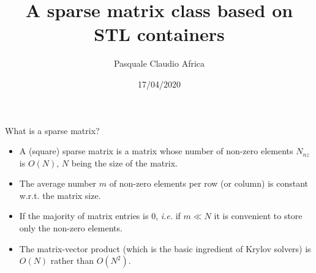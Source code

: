 \documentclass[10pt]{beamer}
\begin{document}
    \title{A sparse matrix class based on STL containers}
    \author{Pasquale Claudio Africa}
    \date{17/04/2020}

\begin{frame}
    \maketitle
\end{frame}


\begin{frame}{What is a sparse matrix?}
\begin{itemize}
\item A (square) sparse matrix is a matrix whose number of non-zero elements $N_{nz}$ is $O(N)$, 
$N$ being the size of the matrix. \\[3mm]
\item The average number $m$ of non-zero elements per row (or column)
is constant w.r.t. the matrix size. \\[3mm]
\item If the majority of matrix entries is $0$, {\it i.e.} if $m \ll N$ it is convenient to store only the non-zero elements.\\[3mm]
\item The matrix-vector product (which is the basic ingredient of Krylov solvers) is $O(N)$ rather than $O(N^{2})$.\\[3mm]
\end{itemize}
\end{frame}
\end{document}
